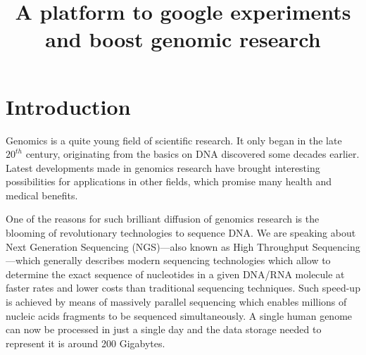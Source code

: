\documentclass[journal]{IEEEtran}
\begin{document}
\title{A platform to google experiments \\and boost genomic research}

\author{
}

\maketitle

\begin{abstract}


\end{abstract}



\IEEEpeerreviewmaketitle



\section{Introduction}
\label{sec:intro}
Genomics is a quite young field of scientific research. It only began in the late $20^{th}$ century, originating from the basics on DNA discovered some decades earlier.  Latest developments made in genomics research have brought interesting possibilities for applications in other fields, which promise many health and medical benefits.

One of the reasons for such brilliant diffusion of genomics research is the blooming of revolutionary technologies to sequence DNA. We are speaking about Next Generation Sequencing (NGS)---also known as High Throughput Sequencing---which generally describes modern sequencing technologies which allow to determine the exact sequence of nucleotides in a given DNA/RNA molecule at faster rates and lower costs than traditional sequencing techniques. Such speed-up is achieved by means of massively parallel sequencing which enables millions of nucleic acids fragments to be sequenced simultaneously.
A single human genome can now be processed in just a single day and the data storage needed to represent it is around 200 Gigabytes.
\end{document}
